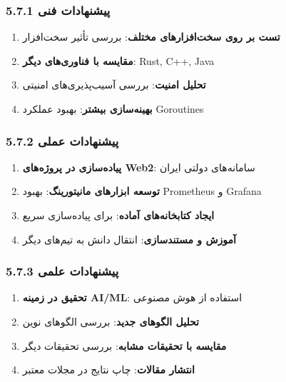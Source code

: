 \documentclass[
]{article}
\providecommand{\tightlist}{%
  \setlength{\itemsep}{0pt}\setlength{\parskip}{0pt}}
\begin{document}
\subsubsection{5.7.1 پیشنهادات
فنی}\label{ux67eux6ccux634ux646ux647ux627ux62fux627ux62a-ux641ux646ux6cc}

\begin{enumerate}
\def\labelenumi{\arabic{enumi}.}
\tightlist
\item
  \textbf{تست بر روی سخت‌افزارهای مختلف}: بررسی تأثیر سخت‌افزار
\item
  \textbf{مقایسه با فناوری‌های دیگر}: Rust, C++, Java
\item
  \textbf{تحلیل امنیت}: بررسی آسیب‌پذیری‌های امنیتی
\item
  \textbf{بهینه‌سازی بیشتر}: بهبود عملکرد Goroutines
\end{enumerate}

\subsubsection{5.7.2 پیشنهادات
عملی}\label{ux67eux6ccux634ux646ux647ux627ux62fux627ux62a-ux639ux645ux644ux6cc}

\begin{enumerate}
\def\labelenumi{\arabic{enumi}.}
\tightlist
\item
  \textbf{پیاده‌سازی در پروژه‌های Web2}: سامانه‌های دولتی ایران
\item
  \textbf{توسعه ابزارهای مانیتورینگ}: بهبود Prometheus و Grafana
\item
  \textbf{ایجاد کتابخانه‌های آماده}: برای پیاده‌سازی سریع
\item
  \textbf{آموزش و مستندسازی}: انتقال دانش به تیم‌های دیگر
\end{enumerate}

\subsubsection{5.7.3 پیشنهادات
علمی}\label{ux67eux6ccux634ux646ux647ux627ux62fux627ux62a-ux639ux644ux645ux6cc}

\begin{enumerate}
\def\labelenumi{\arabic{enumi}.}
\tightlist
\item
  \textbf{تحقیق در زمینه AI/ML}: استفاده از هوش مصنوعی
\item
  \textbf{تحلیل الگوهای جدید}: بررسی الگوهای نوین
\item
  \textbf{مقایسه با تحقیقات مشابه}: بررسی تحقیقات دیگر
\item
  \textbf{انتشار مقالات}: چاپ نتایج در مجلات معتبر
\end{enumerate}
\end{document}
